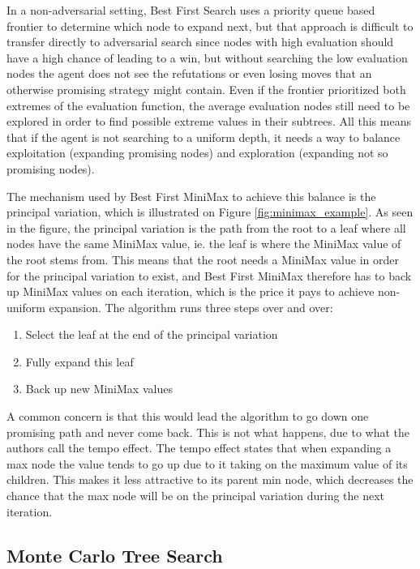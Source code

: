 In a non-adversarial setting, Best First Search uses a priority queue based 
frontier to determine which node to expand next, but that approach is
difficult to transfer directly to adversarial search since nodes with
high evaluation should have a high chance of leading to a win, but
without searching the low evaluation nodes the agent does not see the
refutations or even losing moves that an otherwise promising strategy
might contain. Even if the frontier prioritized both extremes of the
evaluation function, the average evaluation nodes still need to be
explored in order to find possible extreme values in their subtrees.
All this means that if the agent is not searching to a uniform depth,
it needs a way to balance exploitation (expanding promising nodes) and
exploration (expanding not so promising nodes).

The mechanism used by Best First MiniMax to achieve this balance is 
the principal variation, which is illustrated on Figure \ref{fig:minimax_example}.
As seen in the figure, the principal variation is the path from the root
to a leaf where all nodes have the same MiniMax value, ie. the leaf is 
where the MiniMax value of the root stems from. This means that the root
needs a MiniMax value in order for the principal variation to exist, and
Best First MiniMax therefore has to back up MiniMax values on each iteration,
which is the price it pays to achieve non-uniform expansion. The algorithm
runs three steps over and over:
\begin{enumerate}
    \item Select the leaf at the end of the principal variation
    \item Fully expand this leaf
    \item Back up new MiniMax values 
\end{enumerate}
A common concern is that this would lead the algorithm to go down one
promising path and never come back. This is not what happens, due to
what the authors call the tempo effect. The tempo effect states that
when expanding a max node the value tends to go up due to it taking
on the maximum value of its children. This makes it less attractive
to its parent min node, which decreases the chance that the max node
will be on the principal variation during the next iteration.



\newpage
\subsection{Monte Carlo Tree Search}


